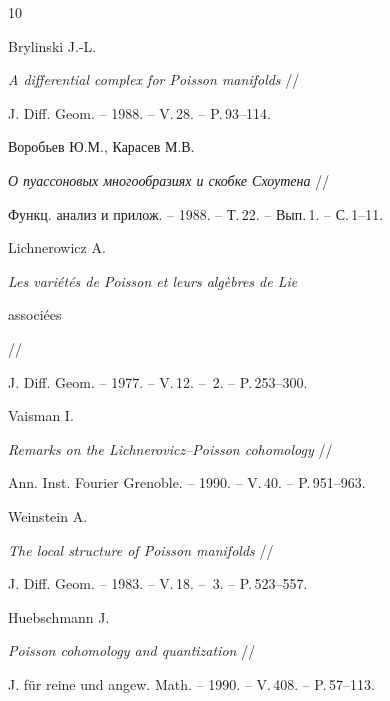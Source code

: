 \begin{thebibliography}{10}










Brylinski J.-L.


{\it A differential complex for Poisson manifolds} //


J. Diff. Geom. -- 1988. -- V.\,28. -- P.\,93--114.







Воробьев Ю.М., Карасев М.В.


{\it О пуассоновых многообразиях и скобке Схоутена} //


Функц. анализ и прилож. -- 1988. -- Т.\,22. -- Вып.\,1. -- С.\,1--11.







Lichnerowicz A.


{\it Les vari\'et\'es de Poisson et leurs alg\`ebres de Lie


associ\'ees} //


J. Diff. Geom. -- 1977. -- V.\,12. -- \No\,2. -- P.\,253--300.







Vaisman I.


{\it Remarks on the Lichnerovicz--Poisson cohomology} //


Ann. Inst. Fourier Grenoble. -- 1990. -- V.\,40. -- P.\,951--963.







Weinstein A.


{\it The local structure of Poisson manifolds} //


J. Diff. Geom. -- 1983. -- V.\,18. -- \No\,3. -- P.\,523--557.










Huebschmann J.


{\it Poisson cohomology and quantization} //


J. f\"ur reine und angew. Math. -- 1990. -- V.\,408. -- P.\,57--113.






\end{thebibliography}
